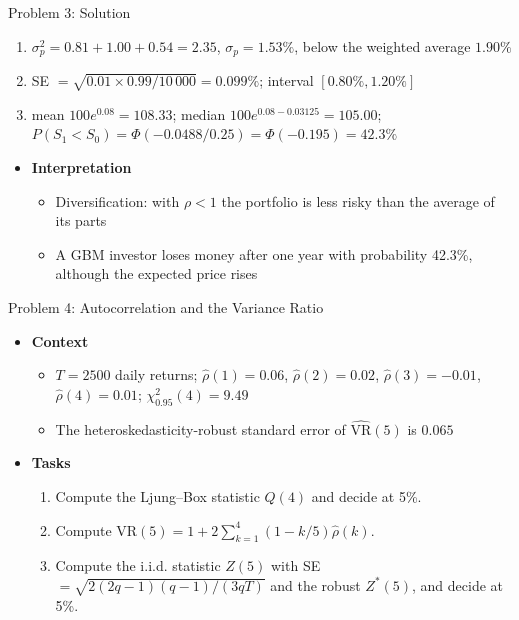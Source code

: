 \begin{frame}{Problem 3: Solution}
\itemsize{\footnotesize}
\begin{enumerate}
    \item $\sigma_p^2 = 0.81 + 1.00 + 0.54 = 2.35$, $\sigma_p = 1.53\%$, below the weighted average $1.90\%$
    \item SE $= \sqrt{0.01 \times 0.99/10\,000} = 0.099\%$; interval $[0.80\%, 1.20\%]$
    \item mean $100e^{0.08} = 108.33$; median $100e^{0.08 - 0.03125} = 105.00$; $P(S_1 < S_0) = \Phi(-0.0488/0.25) = \Phi(-0.195) = 42.3\%$
\end{enumerate}
\begin{itemize}
    \item \textbf{Interpretation}
    \begin{itemize}
        \item Diversification: with $\rho < 1$ the portfolio is less risky than the average of its parts
        \item A GBM investor loses money after one year with probability 42.3\%, although the expected price rises
    \end{itemize}
\end{itemize}
\end{frame}

\begin{frame}{Problem 4: Autocorrelation and the Variance Ratio}
\itemsize{\footnotesize}
\begin{itemize}
    \item \textbf{Context}
    \begin{itemize}
        \item $T = 2500$ daily returns; $\hat\rho(1) = 0.06$, $\hat\rho(2) = 0.02$, $\hat\rho(3) = -0.01$, $\hat\rho(4) = 0.01$; $\chi^2_{0.95}(4) = 9.49$
        \item The heteroskedasticity-robust standard error of $\widehat{\mathrm{VR}}(5)$ is $0.065$
    \end{itemize}
    \item \textbf{Tasks}
\begin{enumerate}
    \item Compute the Ljung--Box statistic $Q(4)$ and decide at 5\%.
    \item Compute $\mathrm{VR}(5) = 1 + 2\sum_{k=1}^{4}(1 - k/5)\hat\rho(k)$.
    \item Compute the i.i.d. statistic $Z(5)$ with SE $= \sqrt{2(2q-1)(q-1)/(3qT)}$ and the robust $Z^*(5)$, and decide at 5\%.
\end{enumerate}
\end{itemize}
\end{frame}

